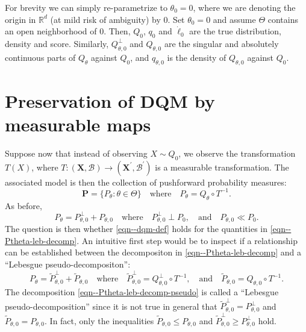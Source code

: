 \documentclass[12pt]{article}
\def\R{\mathbb{R}}
\theoremstyle{definition}
\theoremstyle{plain}
\begin{document}
For brevity we can simply re-parametrize to \(\theta_{0} = 0\), where we are
denoting the origin in \(\R^{d}\) (at mild risk of ambiguity) by \(0\).
Set \(\theta_{0} = 0\) and assume \(\Theta\) contains an open neighborhood of
\(0\).
Then, \(Q_{0}\), \(q_{0}\) and \(\dot{\ell}_{0}\) are the true distribution,
density and score.
Similarly, \(Q_{\theta, 0}^{\perp}\) and \(Q_{\theta, 0}\) are the singular and
absolutely continuous parts of \(Q_{\theta}\) against \(Q_{0}\), and
\(q_{\theta, 0}\) is the density of \(Q_{\theta, 0}\) against \(Q_{0}\).

\section{Preservation of DQM by measurable maps}
\label{sec--dqm-and-meas-maps}

Suppose now that instead of observing \(X \sim Q_{0}\), we observe the
transformation \(T (X)\), where \(T : (\mathbf{X}, \mathcal{B}) \to \left(
\mathbf{X}^{\prime}, \mathcal{B}^{\prime} \right)\) is a measurable
transformation.
The associated model is then the collection of pushforward probability measures:
\begin{equation}
  \mathbf{P} = \{ P_{\theta} : \theta \in \Theta\} \quad \text{where} \quad
  P_{\theta} = Q_{\theta} \circ T^{- 1}.
  \label{eqn--P-T-def}
\end{equation}
As before,
\begin{equation}
  P_{\theta} =  P_{\theta, 0}^{\perp} + P_{\theta, 0}
  \quad \text{where} \quad
  P_{\theta, 0}^{\perp} \perp P_{0},
  \quad \text{and} \quad
  P_{\theta, 0} \ll P_{0}.
  \label{eqn--Ptheta-leb-decomp}
\end{equation}
The question is then whether \eqref{eqn--dqm-def} holds for the quantities in
\eqref{eqn--Ptheta-leb-decomp}.
An intuitive first step would be to inspect if a relationship can be established
between the decompositon in \eqref{eqn--Ptheta-leb-decomp}
and a ``Lebesgue pseudo-decompositon'':
\begin{equation}
  P_{\theta} = \tilde{P}_{\theta, 0}^{\perp} + \tilde{P}_{\theta, 0}
  \quad \text{where} \quad
  \tilde{P}_{\theta, 0}^{\perp} = Q_{\theta, 0}^{\perp} \circ T^{- 1},
  \quad \text{and} \quad
  \tilde{P}_{\theta, 0} = Q_{\theta, 0} \circ T^{- 1}.
  \label{eqn--Ptheta-leb-decomp-pseudo}
\end{equation}
The decomposition \eqref{eqn--Ptheta-leb-decomp-pseudo} is called a ``Lebesgue
pseudo-decomposition'' since it is not true in general that \(\tilde{P}_{\theta,
0}^{\perp} = P_{\theta, 0}^{\perp}\) and \(\tilde{P}_{\theta, 0} = P_{\theta,
0}\).
In fact, only the inequalities
\(\tilde{P}_{\theta, 0} \leq P_{\theta, 0}\) and
\(\tilde{P}_{\theta, 0}^{\perp} \geq P_{\theta, 0}^{\perp}\) hold.
\end{document}
